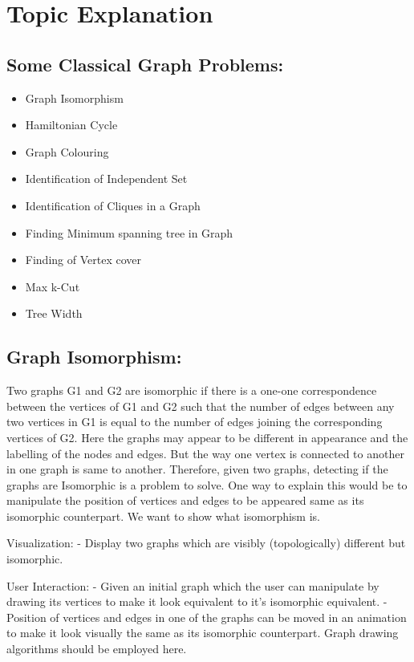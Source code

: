 \hypertarget{topic-explanation}{%
\section{Topic Explanation}\label{topic-explanation}}

\hypertarget{some-classical-graph-problems}{%
\subsection{Some Classical Graph Problems:}\label{some-classical-graph-problems}}

\begin{itemize}
\tightlist
\item
  Graph Isomorphism
\item
  Hamiltonian Cycle
\item
  Graph Colouring
\item
  Identification of Independent Set
\item
  Identification of Cliques in a Graph
\item
  Finding Minimum spanning tree in Graph
\item
  Finding of Vertex cover
\item
  Max k-Cut
\item
  Tree Width
\end{itemize}

\hypertarget{graph-isomorphism}{%
\subsection{Graph Isomorphism:}\label{graph-isomorphism}}

Two graphs G1 and G2 are isomorphic if there is a one-one correspondence
between the vertices of G1 and G2 such that the number of edges between
any two vertices in G1 is equal to the number of edges joining the
corresponding vertices of G2. Here the graphs may appear to be different
in appearance and the labelling of the nodes and edges. But the way one
vertex is connected to another in one graph is same to another.
Therefore, given two graphs, detecting if the graphs are Isomorphic is a
problem to solve. One way to explain this would be to manipulate the
position of vertices and edges to be appeared same as its isomorphic
counterpart. We want to show what isomorphism is.

Visualization: - Display two graphs which are visibly (topologically)
different but isomorphic.

User Interaction: - Given an initial graph which the user can manipulate
by drawing its vertices to make it look equivalent to it's isomorphic
equivalent. - Position of vertices and edges in one of the graphs can be
moved in an animation to make it look visually the same as its
isomorphic counterpart. Graph drawing algorithms should be employed
here.

